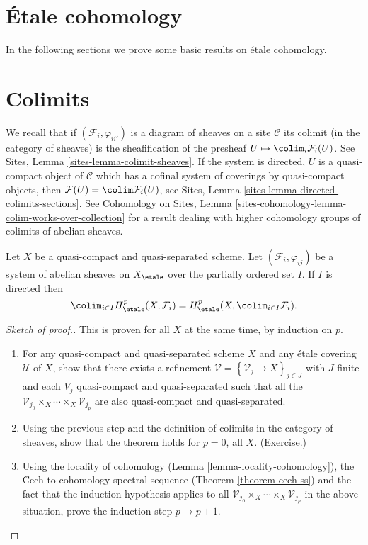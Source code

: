 \section{\'Etale cohomology}
\label{section-etale-cohomology}

\noindent
In the following sections we prove some basic results on \'etale cohomology.


\section{Colimits}
\label{section-colimit}

\noindent
We recall that if $(\mathcal{F}_i, \varphi_{ii'})$
is a diagram of sheaves on a site $\mathcal{C}$ its colimit (in the
category of sheaves) is the sheafification of the presheaf
$U \mapsto \colim_i \mathcal{F}_i(U)$. See
Sites, Lemma \ref{sites-lemma-colimit-sheaves}.
If the system is directed, $U$ is a quasi-compact object of
$\mathcal{C}$ which has a cofinal system of coverings by quasi-compact
objects, then $\mathcal{F}(U) = \colim \mathcal{F}_i(U)$, see
Sites, Lemma \ref{sites-lemma-directed-colimits-sections}.
See Cohomology on Sites, Lemma
\ref{sites-cohomology-lemma-colim-works-over-collection}
for a result dealing with higher cohomology groups of colimits
of abelian sheaves.

\begin{theorem}
\label{theorem-colimit}
Let $X$ be a quasi-compact and quasi-separated scheme. Let
$\left(\mathcal{F}_i, \varphi_{ij}\right)$ be a system of abelian sheaves on
$X_\etale$ over the partially ordered set $I$. If $I$ is directed then
$$
\colim_{i\in I} H_\etale^p(X, \mathcal{F}_i) = H_\etale^p(X,
\colim_{i\in I} \mathcal{F}_i).
$$
\end{theorem}

\begin{proof}[Sketch of proof.]
This is proven for all $X$ at the same time, by induction on $p$.
\begin{enumerate}
\item
For any quasi-compact and quasi-separated scheme $X$ and any \'etale covering
$\mathcal{U}$ of $X$, show that there exists a refinement $\mathcal{V}
=\left\{\mathcal{V}_j \to X\right\}_{j\in J}$ with $J$ finite and each $V_j$
quasi-compact and quasi-separated such that all the $\mathcal{V}_{j_0} \times_X
\cdots \times_X \mathcal{V}_{j_p}$ are also quasi-compact and quasi-separated.
\item
Using the previous step and the definition of colimits in the category of
sheaves, show that the theorem holds for $p=0$, all $X$. (Exercise.)
\item
Using the locality of cohomology
(Lemma \ref{lemma-locality-cohomology}),
the \u Cech-to-cohomology spectral sequence
(Theorem \ref{theorem-cech-ss}) and the fact that the induction
hypothesis applies to all $\mathcal{V}_{j_0} \times_X \cdots \times_X
\mathcal{V}_{j_p}$ in the above situation, prove the induction step $p\to p+1$.
\end{enumerate}
\end{proof}


